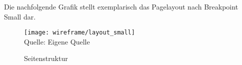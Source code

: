 Die nachfolgende Grafik stellt exemplarisch das Pagelayout nach Breakpoint Small dar.

\begin{figure}[H]
    \caption{Seitenstruktur}
    \texttt{[image: wireframe/layout\_small]}
    \\
    Quelle: Eigene Quelle
\end{figure}

\subsubsection{}
